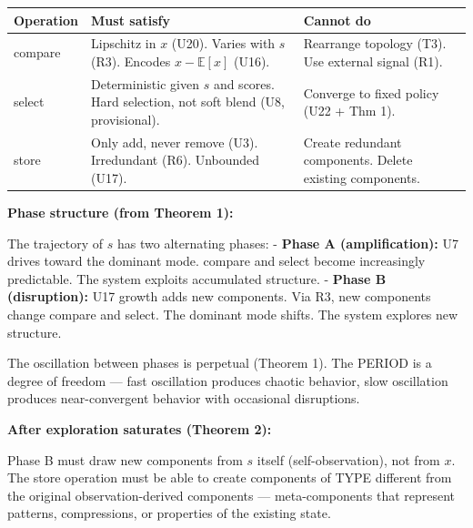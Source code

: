 \documentclass[
  11pt,
]{article}
\newcounter{none} %
\begin{document}
{\def\LTcaptype{none} %
\begin{longtable}[]{@{}
  >{\raggedright\arraybackslash}p{}
  >{\raggedright\arraybackslash}p{}
  >{\raggedright\arraybackslash}p{}@{}}
\toprule\noalign{}
\begin{minipage}[b]{\linewidth}\raggedright
Operation
\end{minipage} & \begin{minipage}[b]{\linewidth}\raggedright
Must satisfy
\end{minipage} & \begin{minipage}[b]{\linewidth}\raggedright
Cannot do
\end{minipage} \\
\midrule\noalign{}
\endhead
\bottomrule\noalign{}
\endlastfoot
compare & Lipschitz in \(x\) (U20). Varies with \(s\) (R3). Encodes
\(x - \mathbb{E}[x]\) (U16). & Rearrange topology (T3). Use external
signal (R1). \\
select & Deterministic given \(s\) and scores. Hard selection, not soft
blend (U8, provisional). & Converge to fixed policy (U22 + Thm 1). \\
store & Only add, never remove (U3). Irredundant (R6). Unbounded (U17).
& Create redundant components. Delete existing components. \\
\end{longtable}
}

\textbf{Phase structure (from Theorem 1):}

The trajectory of \(s\) has two alternating phases: - \textbf{Phase A
(amplification):} U7 drives toward the dominant mode. compare and select
become increasingly predictable. The system exploits accumulated
structure. - \textbf{Phase B (disruption):} U17 growth adds new
components. Via R3, new components change compare and select. The
dominant mode shifts. The system explores new structure.

The oscillation between phases is perpetual (Theorem 1). The PERIOD is a
degree of freedom --- fast oscillation produces chaotic behavior, slow
oscillation produces near-convergent behavior with occasional
disruptions.

\textbf{After exploration saturates (Theorem 2):}

Phase B must draw new components from \(s\) itself (self-observation),
not from \(x\). The store operation must be able to create components of
TYPE different from the original observation-derived components ---
meta-components that represent patterns, compressions, or properties of
the existing state.
\end{document}
